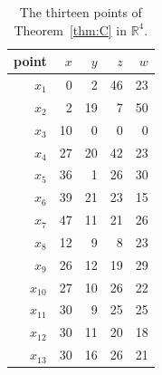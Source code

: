 \begin{table}[tb]
\caption{The thirteen points of Theorem~\ref{thm:C} in $\mathbb{R}^4$.}\label{tab:coordsCfour}
\begin{ruledtabular}
\begin{tabular}{rrrrr}
point & $x$ & $y$ & $z$ & $w$ \\ \hline
$x_{1}$ & 0 & 2 & 46 & 23 \\
$x_{2}$ & 2 & 19 & 7 & 50 \\
$x_{3}$ & 10 & 0 & 0 & 0 \\
$x_{4}$ & 27 & 20 & 42 & 23 \\
$x_{5}$ & 36 & 1 & 26 & 30 \\
$x_{6}$ & 39 & 21 & 23 & 15 \\
$x_{7}$ & 47 & 11 & 21 & 26 \\
$x_{8}$ & 12 & 9 & 8 & 23 \\
$x_{9}$ & 26 & 12 & 19 & 29 \\
$x_{10}$ & 27 & 10 & 26 & 22 \\
$x_{11}$ & 30 & 9 & 25 & 25 \\
$x_{12}$ & 30 & 11 & 20 & 18 \\
$x_{13}$ & 30 & 16 & 26 & 21 \\
\end{tabular}
\end{ruledtabular}
\end{table}
